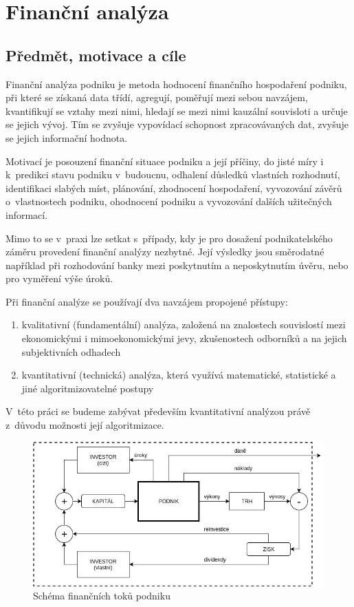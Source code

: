 \chapter{Finanční analýza}


\section{Předmět, motivace a cíle}
Finanční analýza podniku je metoda hodnocení finančního hospodaření podniku, při které se získaná data třídí, agregují, poměřují mezi sebou navzájem, kvantifikují se vztahy mezi nimi, hledají se mezi nimi kauzální souvisloti a určuje se jejich vývoj. Tím se zvyšuje vypovídací schopnost zpracovávaných dat, zvyšuje se jejich informační hodnota\cite{sedl}.

Motivací je posouzení finanční situace podniku a její příčiny, do jisté míry i k~predikci stavu podniku v~budoucnu, odhalení důsledků vlastních rozhodnutí, identifikaci slabých míst, plánování, zhodnocení hospodaření, vyvozování závěrů o~vlastnostech podniku, ohodnocení podniku a vyvozování dalších užitečných informací.

Mimo to se v~praxi lze setkat s~případy, kdy je pro dosažení podnikatelského záměru provedení finanční analýzy nezbytné. Její výsledky jsou směrodatné například při rozhodování banky mezi poskytnutím a neposkytnutím úvěru, nebo pro vyměření výše úroků.

Při finanční analýze se používají dva navzájem propojené přístupy\cite{kova}:
\begin{enumerate}
	\item kvalitativní (fundamentální) analýza, založená na znalostech souvislostí mezi ekonomickými i mimoekonomickými jevy, zkušenostech odborníků a na jejich subjektivních odhadech
	\item kvantitativní (technická) analýza, která využívá matematické, statistické a jiné algoritmizovatelné postupy
\end{enumerate}

V~této práci se budeme zabývat především kvantitativní analýzou právě z~důvodu možnosti její algoritmizace.


\begin{figure}
  \centering
  \includegraphics[width=14cm]{img/ccf.png}
  \caption{Schéma finančních toků podniku}
  \label{ccf}
\end{figure}


